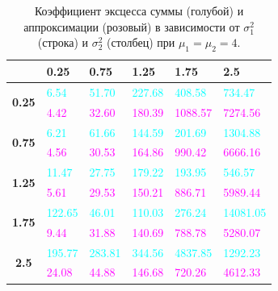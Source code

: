 \documentclass[12pt]{article}
\begin{document}
\begin{table}[!hhh]
	\centering
	\caption{Коэффициент эксцесса суммы (голубой) и аппроксимации (розовый) в зависимости от $\sigma_{1}^{2}$ (строка) и $\sigma_{2}^{2}$ (столбец) при $\mu_{1} = \mu_{2} = 4$. }
	\begin{tabular}{|c|l|l|l|l|l|}
		\hline
		& \textbf{0.25} & \textbf{0.75} & \textbf{1.25} & \textbf{1.75} & \textbf{2.5} \\ \hline
		\multirow{2}{*}{\textbf{0.25}} & \textcolor{cyan}{6.54}          & \textcolor{cyan}{51.70}         & \textcolor{cyan}{227.68}        & \textcolor{cyan}{408.58}        & \textcolor{cyan}{734.47}       \\ \cline{2-6} 
		& \textcolor{magenta}{4.42}          & \textcolor{magenta}{32.60}         & \textcolor{magenta}{180.39}        & \textcolor{magenta}{1088.57}       & \textcolor{magenta}{7274.56}      \\ \hline
		\multirow{2}{*}{\textbf{0.75}} & \textcolor{cyan}{6.21}          & \textcolor{cyan}{61.66}         & \textcolor{cyan}{144.59}        & \textcolor{cyan}{201.69}        & \textcolor{cyan}{1304.88}      \\ \cline{2-6} 
		& \textcolor{magenta}{4.56}          & \textcolor{magenta}{30.53}         & \textcolor{magenta}{164.86}        & \textcolor{magenta}{990.42}        & \textcolor{magenta}{6666.16}      \\ \hline
		\multirow{2}{*}{\textbf{1.25}} & \textcolor{cyan}{11.47}         & \textcolor{cyan}{27.75}         & \textcolor{cyan}{179.22}        & \textcolor{cyan}{193.95}        & \textcolor{cyan}{546.57}       \\ \cline{2-6} 
		& \textcolor{magenta}{5.61}          & \textcolor{magenta}{29.53}         & \textcolor{magenta}{150.21}        & \textcolor{magenta}{886.71}        & \textcolor{magenta}{5989.44}      \\ \hline
		\multirow{2}{*}{\textbf{1.75}} & \textcolor{cyan}{122.65}        & \textcolor{cyan}{46.01}         & \textcolor{cyan}{110.03}        & \textcolor{cyan}{276.24}        & \textcolor{cyan}{14081.05}     \\ \cline{2-6} 
		& \textcolor{magenta}{9.44}          & \textcolor{magenta}{31.88}         & \textcolor{magenta}{140.69}        & \textcolor{magenta}{788.78}        & \textcolor{magenta}{5280.07}      \\ \hline
		\multirow{2}{*}{\textbf{2.5}}  & \textcolor{cyan}{195.77}        & \textcolor{cyan}{283.81}        & \textcolor{cyan}{344.56}        & \textcolor{cyan}{4837.85}       & \textcolor{cyan}{1292.23}      \\ \cline{2-6} 
		& \textcolor{magenta}{24.08}         & \textcolor{magenta}{44.88}         & \textcolor{magenta}{146.68}        & \textcolor{magenta}{720.26}        & \textcolor{magenta}{4612.33}      \\ \hline
	\end{tabular}
\end{table}
\end{document}
